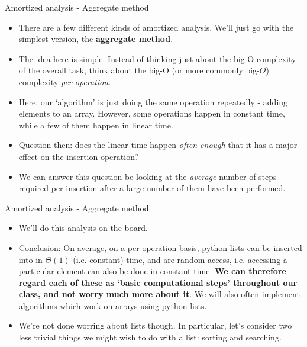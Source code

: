 \documentclass{beamer}
\begin{document}
\begin{frame}{Amortized analysis - Aggregate method}
    \begin{itemize}
        \item There are a few different kinds of amortized analysis. We'll just go with the simplest version, the \textbf{aggregate method}. 
        \pause
        \item The idea here is simple. Instead of thinking just about the big-O complexity of the overall task, think about the big-O (or more commonly big-$\Theta$) complexity \emph{per operation}. 
        \pause
        \item Here, our `algorithm' is just doing the same operation repeatedly - adding elements to an array. However, some operations happen in constant time, while a few of them happen in linear time. 
        \item Question then: does the linear time happen \emph{often enough} that it has a major effect on the insertion operation? 
        \item We can answer this question be looking at the \emph{average} number of steps required per insertion after a large number of them have been performed.   
    \end{itemize}
\end{frame}

\begin{frame}{Amortized analysis - Aggregate method}
    \begin{itemize}
        \item We'll do this analysis on the board. 
        \pause 
        \item Conclusion: On average, on a per operation basis, python lists can be inserted into in $\Theta(1)$ (i.e. constant) time, and are random-access, i.e. accessing a particular element can also be done in constant time. \textbf{We can therefore regard each of these as `basic computational steps' throughout our class, and not worry much more about it}. We will also often implement algorithms which work on arrays using python lists. 
        \pause
        \item We're not done worring about lists though. In particular, let's consider two less trivial things we might wish to do with a list: sorting and searching.   
    \end{itemize}
\end{frame}
\end{document}
